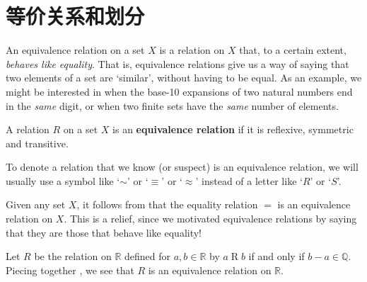\section{等价关系和划分}

An equivalence relation on a set $X$ is a relation on $X$ that, to a certain extent, \textit{behaves like equality}. That is, equivalence relations give us a way of saying that two elements of a set are `similar', without having to be equal. As an example, we might be interested in when the base-10 expansions of two natural numbers end in the \textit{same} digit, or when two finite sets have the \textit{same} number of elements.

\begin{definition}
\label{defEquivalenceRelation}
A relation $R$ on a set $X$ is an \textbf{equivalence relation} if it is reflexive, symmetric and transitive.
\end{definition}

To denote a relation that we know (or suspect) is an equivalence relation, we will usually use a symbol like `$\sim$'  or `$\equiv$'  or `$\approx$'  instead of a letter like `$R$' or `$S$'.

\begin{example}
\label{exEqualityIsEquivalenceRelation}
Given any set $X$, it follows from  that the equality relation $=$ is an equivalence relation on $X$. This is a relief, since we motivated equivalence relations by saying that they are those that behave like equality!
\end{example}

\begin{example}
\label{exDifferenceOfRealsInQIsEquivalenceRelation}
Let $R$ be the relation on $\mathbb{R}$ defined for $a,b \in \mathbb{R}$ by $a \mathrel{R} b$ if and only if $b-a \in \mathbb{Q}$. Piecing together , we see that $R$ is an equivalence relation on $\mathbb{R}$.
\end{example}

